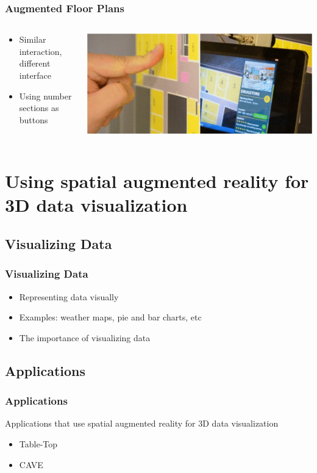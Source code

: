 \documentclass{beamer}
\begin{document}
\begin{frame}
	\frametitle{Augmented Floor Plans}
	\begin{columns}
	\begin{column}{0.45\textwidth}
	\begin{itemize}
		\item Similar interaction, different interface
		\item Using number sections as buttons
	\end{itemize}
	\end{column}
	\begin{column}{0.55\textwidth}
	\includegraphics[width=\textwidth]{images/AugmentedFloorPlans}
	\end{column}
	\end{columns}
	
\end{frame}

\section[Using spatial augmented reality for 3D data visualization]{Using spatial augmented reality for 3D data visualization}

\subsection{Visualizing Data}
\begin{frame}	
\frametitle{Visualizing Data}
	\begin{itemize}
		\item Representing data visually
		\item Examples: weather maps, pie and bar charts, etc
		\item The importance of visualizing data
	\end{itemize}
\end{frame}

\subsection{Applications}
\begin{frame}
\frametitle{Applications}
	Applications that use spatial augmented reality for 3D data visualization   
	\begin{itemize}
		\item Table-Top
		\item CAVE
	\end{itemize}
\end{frame}
\end{document}
